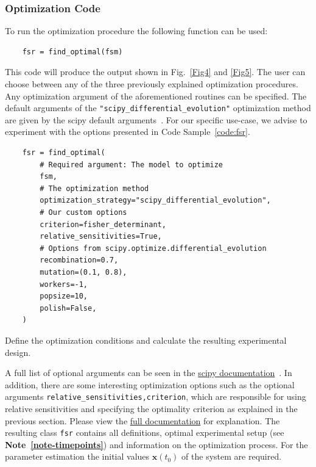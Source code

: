 \documentclass[graybox]{svmult}
\newcommand{\mbx}{\mathbf{x}}
\begin{document}
\subsubsection{Optimization Code}
To run the optimization procedure the following function can be used:
\begin{verbatim}
    fsr = find_optimal(fsm)
\end{verbatim}
This code will produce the output shown in Fig.~\ref{Fig4} and \ref{Fig5}.
The user can choose between any of the three previously explained optimization procedures.
Any optimization argument of the aforementioned routines can be specified.
The default arguments of the \texttt{"scipy_differential_evolution"} optimization method are given by the scipy default arguments~\cite{scipydiffev}.
For our specific use-case, we advise to experiment with the options presented in Code Sample~\ref{code:fsr}.
\begin{code}[h]
    \begin{verbatim}
    fsr = find_optimal(
        # Required argument: The model to optimize
        fsm,
        # The optimization method
        optimization_strategy="scipy_differential_evolution",
        # Our custom options
        criterion=fisher_determinant,
        relative_sensitivities=True,
        # Options from scipy.optimize.differential_evolution
        recombination=0.7,
        mutation=(0.1, 0.8),
        workers=-1,
        popsize=10,
        polish=False,
    )
    \end{verbatim}
    \caption{Define the optimization conditions and calculate the resulting experimental design.}
    \label{code:fsr}
\end{code}
A full list of optional arguments can be seen in the \href{https://docs.scipy.org/doc/scipy/reference/optimize.html#global-optimization}{scipy documentation}~\cite{virtanenSciPyFundamentalAlgorithms2020}.
In addition, there are some interesting optimization options such as the optional arguments \texttt{relative_sensitivities,criterion}, which are responsible for using relative sensitivities and specifying the optimality criterion as explained in the previous section.
Please view the \href{https://spatial-systems-biology-freiburg.github.io/FisInMa/}{full documentation} for explanation.
The resulting class \texttt{fsr} contains all definitions, optimal experimental setup (see \textbf{Note~\ref{note-timepoints}}) and information on the optimization process.
For the parameter estimation the initial values $\mbx(t_0)$ of the system are required.
%
\end{document}
